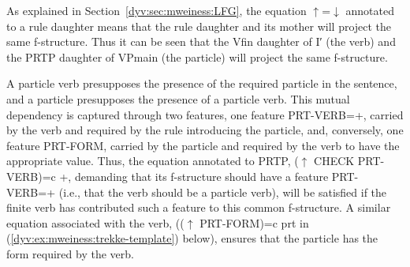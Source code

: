 \documentclass[output=paper]{langsci/langscibook}
\begin{document}
%
%

As explained in Section~\ref{dyv:sec:mweiness:LFG}, the equation $\uparrow$=$\downarrow$ annotated to a rule daughter means that the rule daughter and its mother will project the same f-structure.
Thus it can be seen that the \textsf{Vfin} daughter of \textsf{I′} (the verb) and the \textsf{PRTP} daughter of \textsf{VPmain} (the particle) will project the same f-structure.

A particle verb presupposes the presence of the required particle in the sentence, and a particle presupposes the presence of a particle verb.
This mutual dependency is captured through two features, one feature \textsf{PRT-VERB=+}, carried by the verb and required by the rule introducing the particle, and, conversely, one feature \textsf{PRT-FORM}, carried by the particle and required by the verb to have the appropriate value.
Thus, the  equation annotated to \textsf{PRTP}, \textsf{($\uparrow$ CHECK PRT-VERB)=c +}, demanding that its f-structure should have a feature \textsf{PRT-VERB=+} (i.e., that the verb should be a particle verb), will be satisfied if the finite verb has contributed such a feature to this common f-structure.
A similar  equation associated with the verb, (\textsf{($\uparrow$ PRT-FORM)=c prt} in (\ref{dyv:ex:mweiness:trekke-template}) below), ensures that the particle has the form required by the verb.
\end{document}
